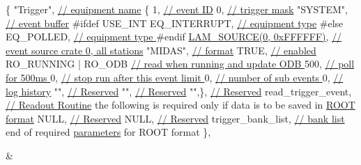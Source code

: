 \begin{TabularC}{2}
\begin{DoxyPre}
\{ "Trigger",                          \hyperlink{FE_table_FE_tbl_EqName}{// equipment name}
     \{ 1,                            \hyperlink{FE_table_FE_tbl_EventID}{// event ID}
       0,                            \hyperlink{FE_table_FE_tbl_TrigMask}{// trigger mask}
       "SYSTEM",                     \hyperlink{FE_table_FE_tbl_Buffer}{// event buffer}
\#ifdef USE\_INT
       EQ\_INTERRUPT,                 \hyperlink{FE_table_FE_tbl_EqType}{// equipment type} 
\#else
       EQ\_POLLED,                    \hyperlink{FE_table_FE_tbl_EqType}{// equipment type }
\#endif
       \hyperlink{group__midasincludecode_ga93fde3913a488880c4f96267e24579ee}{LAM\_SOURCE(0, 0xFFFFFF)},      \hyperlink{FE_table_FE_tbl_IntSrc}{// event source crate 0, all stations}
       "MIDAS",                      \hyperlink{FE_table_FE_tbl_Format}{// format}
       TRUE,                         \hyperlink{FE_table_FE_tbl_EqEnabled}{// enabled }
       RO\_RUNNING | RO\_ODB \hyperlink{FE_table_FE_tbl_ReadOn}{// read when running and update ODB }      
       500,                          \hyperlink{FE_table_FE_tbl_Period}{// poll for 500ms  }
       0,                            \hyperlink{FE_table_FE_tbl_EventLimit}{// stop run after this event limit }
       0,                            \hyperlink{FE_table_FE_tbl_NumSubevents}{// number of sub events }
       0,                            \hyperlink{FE_table_FE_tbl_History}{// log history} 
       "",                           \hyperlink{FE_table_FE_tbl_Reserved}{// Reserved}
       "",                           \hyperlink{FE_table_FE_tbl_Reserved}{// Reserved}
       "",\},                         \hyperlink{FE_table_FE_tbl_Reserved}{// Reserved}
       read\_trigger\_event,           \hyperlink{FE_table_FE_tbl_ReadoutRoutine}{// Readout Routine}    
the following is required only if data is to be saved in \hyperlink{FE_eqdec_FE_ROOT_Structure_Def}{ROOT format}
       NULL,                         \hyperlink{FE_table_FE_tbl_ClassDriver}{// Reserved}
       NULL,                         \hyperlink{FE_table_FE_tbl_DevDriverList}{// Reserved}
       trigger\_bank\_list,            \hyperlink{FE_table_FE_tbl_BankDef}{// bank list}
end of required \hyperlink{structparameters}{parameters} for ROOT format
     \},
\end{DoxyPre}
  &
\begin{DoxyPre}\end{DoxyPre}



\begin{DoxyPre}\end{DoxyPre}




\end{TabularC}
